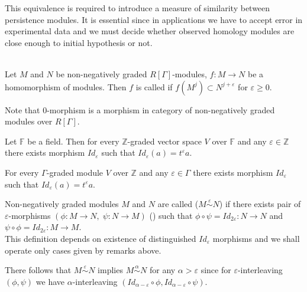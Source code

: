 This equivalence is required to introduce a measure of similarity between persistence modules. It is essential since in applications we have to accept error in experimental data and we must decide whether observed homology modules are close enough to initial hypothesis or not.

\begin{definition} {\cite[Definition 2.7]{GS16}}\\
  Let $M$ and $N$ be non-negatively graded $R[\Gamma]$-modules, $f : M \to N$ be a homomorphism of modules. Then $f$ is called  if $f(M^j) \subset N^{j+\varepsilon}$ for $\varepsilon \geq 0$.
\end{definition}

\begin{remark}
  Note that $0$-morphism is a morphism in category of non-negatively graded modules over $R[\Gamma]$.
\end{remark}

\begin{remark}
  Let $\mathbb{F}$ be a field. Then for every $\mathbb{Z}$-graded vector space $V$ over $\mathbb{F}$ and any $\varepsilon \in \mathbb{Z}$ there exists morphism $Id_{\varepsilon}$ such that $Id_{\varepsilon}(a) = t^{\varepsilon}a$.
\end{remark}

\begin{remark}
  For every $\Gamma$-graded module $V$ over $\mathbb{Z}$ and any $\varepsilon \in \Gamma$ there exists morphism $Id_{\varepsilon}$ such that $Id_{\varepsilon}(a) = t^{\varepsilon}a$.
\end{remark}

\begin{definition}
  Non-negatively graded modules $M$ and $N$ are called  ($M \stackrel{\varepsilon}{\sim} N$) if there exists pair of $\varepsilon$-morphisms $(\phi : M \to N,\;\psi : N \to M)$ () such that $\phi \circ \psi = Id_{2\varepsilon} : N \to N$ and $\psi \circ \phi = Id_{2\varepsilon} : M \to M$.\\

  This definition depends on existence of distinguished $Id_{\varepsilon}$ morphisms and we shall operate only cases given by remarks above.
\end{definition}

\begin{remark}
  There follows that $M \stackrel{\varepsilon}{\sim} N$ implies $M \stackrel{\alpha}{\sim} N$ for any $\alpha > \varepsilon$ since for $\varepsilon$-interleaving $(\phi, \psi)$ we have $\alpha$-interleaving $(Id_{\alpha - \varepsilon} \circ \phi, Id_{\alpha - \varepsilon} \circ \psi)$.
\end{remark}

